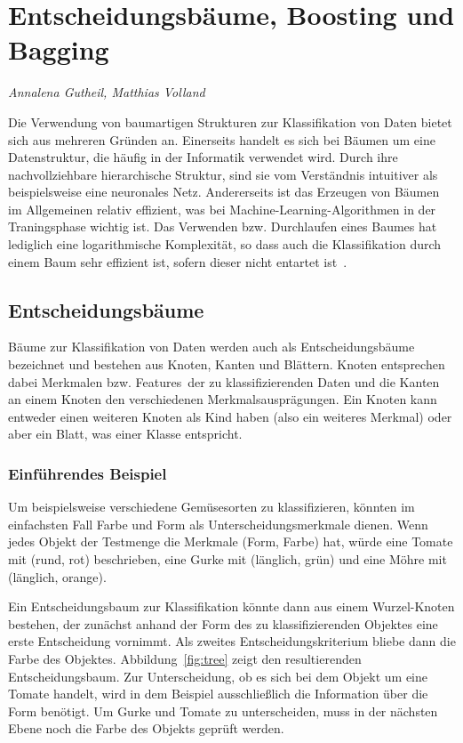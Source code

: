 \section{Entscheidungsbäume, Boosting und Bagging}
\label{mainsec:trees}
\textit{Annalena Gutheil, Matthias Volland}

Die Verwendung von baumartigen Strukturen zur Klassifikation von Daten bietet sich aus mehreren Gründen an. 
Einerseits handelt es sich bei Bäumen um eine Datenstruktur, die häufig in der Informatik verwendet wird. Durch ihre nachvollziehbare hierarchische Struktur, sind sie vom Verständnis intuitiver als beispielsweise eine neuronales Netz.
Andererseits ist das Erzeugen von Bäumen im Allgemeinen relativ effizient, was bei Machine-Learning-Algorithmen 
in der Traningsphase wichtig ist. Das Verwenden bzw. Durchlaufen eines Baumes hat lediglich eine logarithmische Komplexität, 
so dass auch die Klassifikation durch einem Baum sehr effizient ist, sofern dieser nicht entartet ist~\cite{Marsland}. 

\subsection{Entscheidungsbäume}

Bäume zur Klassifikation von Daten werden auch als Entscheidungsbäume bezeichnet und bestehen aus Knoten, Kanten und Blättern. Knoten entsprechen dabei Merkmalen bzw. \glqq Features\grqq\ der zu klassifizierenden Daten und die Kanten an einem Knoten den verschiedenen Merkmalsausprägungen. 
Ein Knoten kann entweder einen weiteren Knoten als Kind haben (also ein weiteres Merkmal) oder aber ein Blatt, was einer Klasse entspricht.

\subsubsection{Einführendes Beispiel}
Um beispielsweise verschiedene Gemüsesorten zu klassifizieren, könnten im einfachsten Fall Farbe und Form als Unterscheidungsmerkmale dienen. Wenn jedes Objekt der Testmenge die Merkmale (Form, Farbe) hat, würde eine Tomate mit (rund, rot) beschrieben, eine Gurke mit (länglich, grün) und eine Möhre mit (länglich, orange).

Ein Entscheidungsbaum zur Klassifikation könnte dann aus einem Wurzel-Knoten bestehen, der zunächst anhand der Form 
des zu klassifizierenden Objektes eine erste Entscheidung vornimmt. Als zweites Entscheidungskriterium bliebe dann die Farbe des Objektes. Abbildung~\ref{fig:tree} zeigt den resultierenden Entscheidungsbaum. Zur Unterscheidung, ob es sich bei dem Objekt um eine Tomate handelt, wird in dem Beispiel ausschließlich die Information über die Form benötigt. Um Gurke und Tomate zu unterscheiden, muss in der nächsten Ebene noch die Farbe des Objekts geprüft werden.

